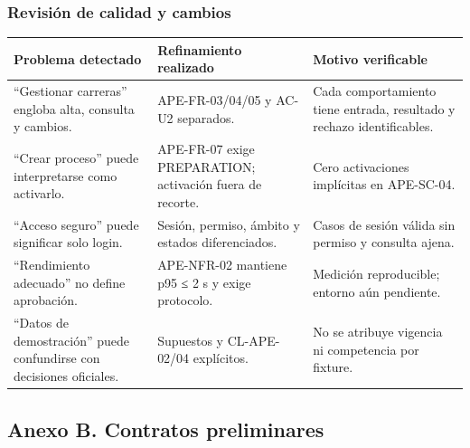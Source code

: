 \documentclass[11pt,a4paper]{article}
\begin{document}
\subsubsection{Revisión de calidad y
cambios}\label{revisiuxf3n-de-calidad-y-cambios}

{\def\LTcaptype{none} %
\begin{longtable}[]{@{}
  >{\raggedright\arraybackslash}p{}
  >{\raggedright\arraybackslash}p{}
  >{\raggedright\arraybackslash}p{}@{}}
\toprule\noalign{}
\begin{minipage}[b]{\linewidth}\raggedright
Problema detectado
\end{minipage} & \begin{minipage}[b]{\linewidth}\raggedright
Refinamiento realizado
\end{minipage} & \begin{minipage}[b]{\linewidth}\raggedright
Motivo verificable
\end{minipage} \\
\midrule\noalign{}
\endhead
\bottomrule\noalign{}
\endlastfoot
``Gestionar carreras'' engloba alta, consulta y cambios. &
APE-FR-03/04/05 y AC-U2 separados. & Cada comportamiento tiene entrada,
resultado y rechazo identificables. \\
``Crear proceso'' puede interpretarse como activarlo. & APE-FR-07 exige
PREPARATION; activación fuera de recorte. & Cero activaciones implícitas
en APE-SC-04. \\
``Acceso seguro'' puede significar solo login. & Sesión, permiso, ámbito
y estados diferenciados. & Casos de sesión válida sin permiso y consulta
ajena. \\
``Rendimiento adecuado'' no define aprobación. & APE-NFR-02 mantiene p95
≤ 2 s y exige protocolo. & Medición reproducible; entorno aún
pendiente. \\
``Datos de demostración'' puede confundirse con decisiones oficiales. &
Supuestos y CL-APE-02/04 explícitos. & No se atribuye vigencia ni
competencia por fixture. \\
\end{longtable}
}


\subsection{Anexo B. Contratos
preliminares}\label{anexo-b.-contratos-preliminares}
\end{document}
